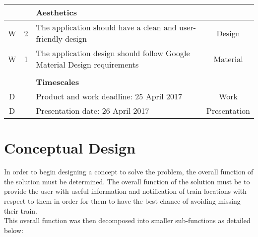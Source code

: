 \documentclass[paper=a4, fontsize=12pt]{scrartcl} %
\numberwithin{equation}{section} %
\numberwithin{figure}{section} %
\numberwithin{table}{section} %
\begin{document}
\begin{center}
\begin{tabular}{|| c | c || p{12cm} || c ||}
            && \textbf{Aesthetics} & \\
            \hline
            W & 2 & The application should have a clean and user-friendly design & Design \\
            W & 1 & The application design should follow Google Material Design requirements & Material \\
            &&& \\

            && \textbf{Timescales} & \\
            \hline
            D && Product and work deadline: 25 April 2017 & Work \\
            D && Presentation date: 26 April 2017 & Presentation \\
            \hline

        \end{tabular}
        \end{center}

    \section{Conceptual Design}

        In order to begin designing a concept to solve the problem, the overall function of the solution must be determined. The overall function of the solution must be to provide the user with useful information and notification of train locations with respect to them in order for them to have the best chance of avoiding missing their train.\\

        This overall function was then decomposed into smaller sub-functions as detailed below:\\
\end{document}
